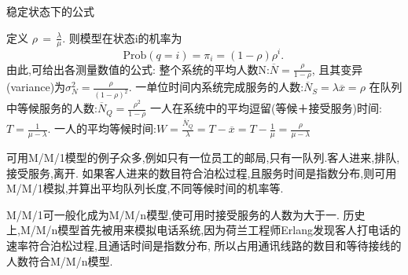 \documentclass{article}
\begin{document}
稳定状态下的公式

定义 $\scriptstyle \rho \,=\,{\tfrac  {\lambda }{\mu }}$.
则模型在状态i的机率为
$$ {\mbox{Prob}}(q=i)=\pi _{i}=(1-\rho )\rho ^{i}.\, $$
由此,可给出各测量数值的公式:
整个系统的平均人数N:$\overline N={\frac  {\rho }{1-\rho }}$,
且其变异(variance)为$\sigma _{N}^{2}={\frac  {\rho }{(1-\rho )^{2}}}$.
一单位时间内系统完成服务的人数:$\overline N_{S}=\lambda \overline x=\rho$
在队列中等候服务的人数:$\overline N_{Q}={\frac  {\rho ^{2}}{1-\rho }}$
一人在系统中的平均逗留(等候＋接受服务)时间:$T={\frac  {1}{\mu -\lambda }}$.
一人的平均等候时间:$W={\frac  {\overline N_{Q}}{\lambda }}=T-\overline x=T-{\frac  {1}{\mu }}={\frac  {\rho }{\mu -\lambda }}$

\begin{example}
可用M/M/1模型的例子众多,例如只有一位员工的邮局,只有一队列.客人进来,排队,接受服务,离开.
如果客人进来的数目符合泊松过程,且服务时间是指数分布,则可用M/M/1模拟,并算出平均队列长度,不同等候时间的机率等.

M/M/1可一般化成为M/M/n模型,使可用时接受服务的人数为大于一.
历史上,M/M/n模型首先被用来模拟电话系统,因为荷兰工程师Erlang发现客人打电话的速率符合泊松过程,且通话时间是指数分布,
所以占用通讯线路的数目和等待接线的人数符合M/M/n模型.
\end{example}
\end{document}
